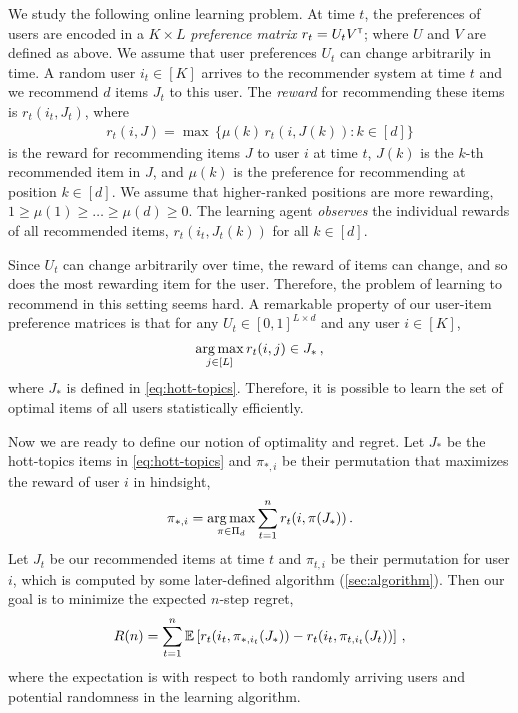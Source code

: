 We study the following online learning problem. At time $t$, the preferences of users are encoded in a $K \times L$ \emph{preference matrix} $r_t = U_t V^\mathsf{\scriptscriptstyle T}$; where $U$ and $V$ are defined as above. We assume that user preferences $U_t$ can change arbitrarily in time. A random user $i_t \in [K]$ arrives to the recommender system at time $t$ and we recommend $d$ items $J_t$ to this user. The \emph{reward} for recommending these items is $r_t(i_t, J_t)$, where
\begin{align}
  r_t(i, J) =
  \max \, \{\mu(k) \, r_t(i, J(k)): k \in [d]\}
  \label{eq:reward}
\end{align}
is the reward for recommending items $J$ to user $i$ at time $t$, $J(k)$ is the $k$-th recommended item in $J$, and $\mu(k)$ is the preference for recommending at position $k \in [d]$. We assume that higher-ranked positions are more rewarding, $1 \geq \mu(1) \geq \dots \geq \mu(d) \geq 0$. The learning agent \emph{observes} the individual rewards of all recommended items, $r_t(i_t, J_t(k))$ for all $k \in [d]$. 

Since $U_t$ can change arbitrarily over time, the reward of items can change, and so does the most rewarding item for the user. Therefore, the problem of learning to recommend in this setting seems hard. A remarkable property of our user-item preference matrices is that for any $U_t \in [0, 1]^{L \times d}$ and any user $i \in [K]$,
\begin{align*}
  \mathop{\rm arg\,max}_{j \in [L]} r_t(i, j) \in J_\ast\,,
\end{align*}
where $J_\ast$ is defined in \eqref{eq:hott-topics}. Therefore, it is possible to learn the set of optimal items of all users statistically efficiently.

Now we are ready to define our notion of optimality and regret. Let $J_\ast$ be the hott-topics items in \eqref{eq:hott-topics} and $\pi_{\ast, i}$ be their permutation that maximizes the reward of user $i$ in hindsight,
\begin{align*}
  \pi_{\ast, i} =
  \mathop{\rm arg\,max}_{\pi \in \Pi_d} \sum_{t = 1}^n r_t(i, \pi(J_\ast))\,.
\end{align*}
Let $J_t$ be our recommended items at time $t$ and $\pi_{t, i}$ be their permutation for user $i$, which is computed by some later-defined algorithm (\cref{sec:algorithm}). Then our goal is to minimize the expected $n$-step regret,
\begin{align}
  R(n) =
  \sum_{t = 1}^n \mathbb{E}\left[r_t(i_t, \pi_{\ast, i_t}(J_\ast)) - r_t(i_t, \pi_{t, i_t}(J_t))\right]\,,
  \label{eq:regret}
\end{align}
where the expectation is with respect to both randomly arriving users and potential randomness in the learning algorithm.
